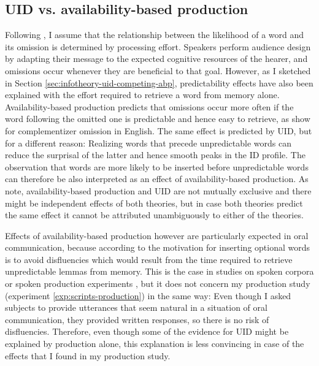 \subsection{UID vs. availability-based production}

Following \citet{hale2001}, I assume that the relationship between the likelihood of a word and its omission is determined by processing effort. Speakers perform audience design by adapting their message to  the expected cognitive resources of the hearer, and omissions occur whenever they are beneficial to that goal. However, as I sketched in Section \ref{sec:infotheory-uid-competing-abp}, predictability effects have also been explained with the effort required to retrieve a word from memory alone. Availability-based production predicts that omissions occur more often if the word following the omitted one is predictable and hence easy to retrieve, as \citet{ferreira.dell2000} show for complementizer omission in English. The same effect is predicted by UID, but for a different reason: Realizing words that precede unpredictable words can reduce the surprisal of the latter and hence smooth peaks in the ID profile. The observation that words are more likely to be inserted before unpredictable words can therefore be also interpreted as an effect of availability-based production. As \citet{jaeger.buz2017} note, availability-based production and UID are not mutually exclusive and there might be independent effects of both theories, but in case both theories predict the same effect it cannot be attributed unambiguously to either of the theories.

Effects of availability-based production however are particularly expected in oral communication, because according to \citet{ferreira.dell2000} the motivation for inserting optional words is to avoid disfluencies which would result from the time required to retrieve unpredictable lemmas from memory. This is the case in studies on spoken corpora \citep{levy.jaeger2007, frank.jaeger2008, jaeger2010} or spoken production experiments \citep{kurumada.jaeger2015, norcliffe.jaeger2016}, but it does not concern my production study (experiment \ref{exp:scripts-production}) in the same way: Even though I asked subjects to provide utterances that seem natural in a situation of oral communication, they provided written responses, so there is no risk of disfluencies. Therefore, even though some of the evidence for UID might be explained by production alone, this explanation is less convincing in case of the effects that I found in my production study.

